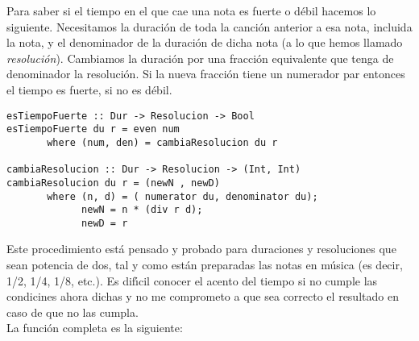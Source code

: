 \documentclass[a4paper]{report}
\begin{document}
Para saber si el tiempo en el que cae una nota es fuerte o d\'ebil hacemos
lo siguiente. Necesitamos la duraci\'on de toda la canci\'on anterior a esa nota,
incluida la nota, y el denominador de la duraci\'on de dicha 
nota (a lo que hemos llamado \emph{resoluci\'on}). Cambiamos la duraci\'on
por una fracci\'on equivalente que tenga de denominador la resoluci\'on. 
Si la nueva fracci\'on tiene un numerador par entonces el tiempo es fuerte,
si no es d\'ebil.\\
\small
\begin{verbatim}
esTiempoFuerte :: Dur -> Resolucion -> Bool
esTiempoFuerte du r = even num
       where (num, den) = cambiaResolucion du r

cambiaResolucion :: Dur -> Resolucion -> (Int, Int)
cambiaResolucion du r = (newN , newD)
       where (n, d) = ( numerator du, denominator du);
             newN = n * (div r d);
             newD = r
\end{verbatim}
\normalsize
\indent Este procedimiento est\'a pensado y probado para duraciones y resoluciones
que sean potencia de dos, tal y como est\'an preparadas las notas en m\'usica
(es decir, 1/2, 1/4, 1/8, etc.). Es dif\'\i cil conocer el acento del tiempo
si no cumple las condicines ahora dichas y no me comprometo a que sea
correcto el resultado en caso de que no las cumpla.\\
\indent La funci\'on completa es la siguiente:\\

\small
\end{document}
